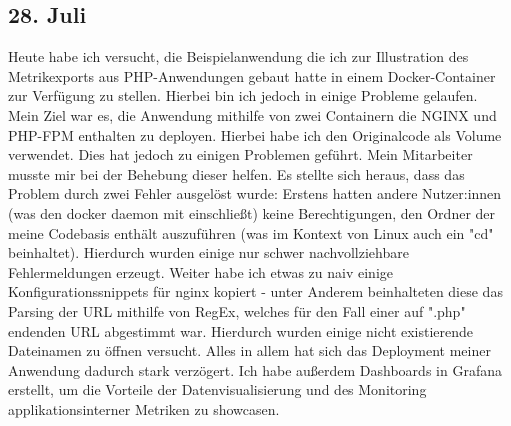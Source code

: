 \subsection{28. Juli}
Heute habe ich versucht, die Beispielanwendung die ich zur Illustration des Metrikexports aus PHP-Anwendungen gebaut hatte in einem Docker-Container zur Verfügung zu stellen. Hierbei bin ich jedoch in einige Probleme gelaufen. Mein Ziel war es, die Anwendung mithilfe von zwei Containern die NGINX und PHP-FPM enthalten zu deployen. Hierbei habe ich den Originalcode als Volume verwendet. Dies hat jedoch zu einigen Problemen geführt. Mein Mitarbeiter musste mir bei der Behebung dieser helfen. Es stellte sich heraus, dass das Problem durch zwei Fehler ausgelöst wurde: Erstens hatten andere Nutzer:innen (was den docker daemon mit einschließt) keine Berechtigungen, den Ordner der meine Codebasis enthält auszuführen (was im Kontext von Linux auch ein "cd" beinhaltet). Hierdurch wurden einige nur schwer nachvollziehbare Fehlermeldungen erzeugt. Weiter habe ich etwas zu naiv einige Konfigurationssnippets für nginx kopiert - unter Anderem beinhalteten diese das Parsing der URL mithilfe von RegEx, welches für den Fall einer auf ".php" endenden URL abgestimmt war. Hierdurch wurden einige nicht existierende Dateinamen zu öffnen versucht. Alles in allem hat sich das Deployment meiner Anwendung dadurch stark verzögert. Ich habe außerdem Dashboards in Grafana erstellt, um die Vorteile der Datenvisualisierung und des Monitoring applikationsinterner Metriken zu showcasen.